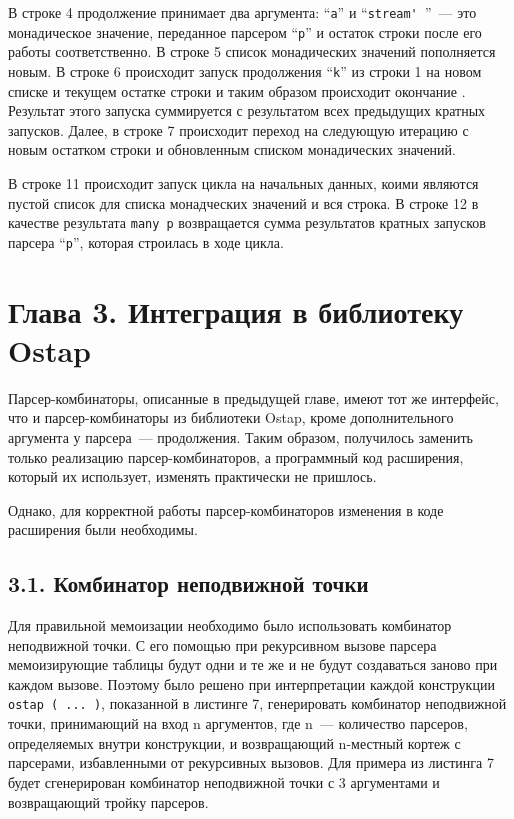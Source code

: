 В строке 4 продолжение принимает два аргумента: ``\lstinline|a|'' и ``\lstinline|stream' |''~--- это монадическое значение, переданное парсером ``\lstinline|р|'' и остаток строки после его работы соответственно. В строке 5 список монадических значений пополняется новым. В строке 6 происходит запуск продолжения ``\lstinline|k|'' из строки 1 на новом списке и текущем остатке строки и таким образом происходит окончание . Результат этого запуска суммируется с результатом всех предыдущих кратных запусков. Далее, в строке 7 происходит переход на следующую итерацию с новым остатком строки и обновленным списком монадических  значений.

В строке 11 происходит запуск цикла на начальных данных, коими являются пустой список для списка монадческих значений и вся строка. В строке 12 в качестве результата \lstinline|many p| возвращается сумма результатов кратных запусков парсера ``\lstinline|р|'', которая строилась в ходе цикла.

\section*{Глава 3. Интеграция в библиотеку Ostap}
Парсер-комбинаторы, описанные в предыдущей главе, имеют тот же интерфейс, что и парсер-комбинаторы из библиотеки Ostap, кроме дополнительного аргумента у парсера~--- продолжения. Таким образом, получилось заменить только реализацию парсер-комбинаторов, а программный код расширения, который их использует, изменять практически не пришлось.

Однако, для корректной работы парсер-комбинаторов изменения в коде расширения были необходимы.

\subsection*{3.1. Комбинатор неподвижной точки}
Для правильной мемоизации необходимо было использовать комбинатор неподвижной точки. С его помощью при рекурсивном вызове парсера мемоизирующие таблицы будут одни и те же и не будут создаваться заново при каждом вызове. Поэтому было решено при интерпретации каждой конструкции \lstinline|ostap ( ... )|, показанной в листинге 7, генерировать комбинатор неподвижной точки, принимающий на вход n аргументов, где n~--- количество парсеров, определяемых внутри конструкции, и возвращающий n-местный кортеж с парсерами, избавленными от рекурсивных вызовов. Для примера из листинга 7 будет сгенерирован комбинатор неподвижной точки с 3 аргументами и возвращающий тройку парсеров.

